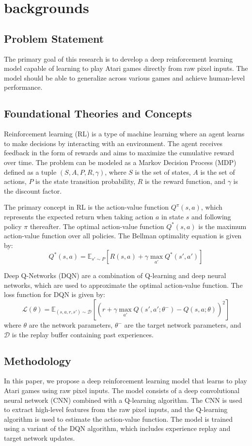 \section{backgrounds}

\subsection{Problem Statement}
The primary goal of this research is to develop a deep reinforcement learning model capable of learning to play Atari games directly from raw pixel inputs. The model should be able to generalize across various games and achieve human-level performance.

\subsection{Foundational Theories and Concepts}
Reinforcement learning (RL) is a type of machine learning where an agent learns to make decisions by interacting with an environment. The agent receives feedback in the form of rewards and aims to maximize the cumulative reward over time. The problem can be modeled as a Markov Decision Process (MDP) defined as a tuple $(S, A, P, R, \gamma)$, where $S$ is the set of states, $A$ is the set of actions, $P$ is the state transition probability, $R$ is the reward function, and $\gamma$ is the discount factor.

The primary concept in RL is the action-value function $Q^{\pi}(s, a)$, which represents the expected return when taking action $a$ in state $s$ and following policy $\pi$ thereafter. The optimal action-value function $Q^{*}(s, a)$ is the maximum action-value function over all policies. The Bellman optimality equation is given by:
\[Q^{*}(s, a) = \mathbb{E}_{s' \sim P}[R(s, a) + \gamma \max_{a'} Q^{*}(s', a')]\]

Deep Q-Networks (DQN) are a combination of Q-learning and deep neural networks, which are used to approximate the optimal action-value function. The loss function for DQN is given by:
\[\mathcal{L}(\theta) = \mathbb{E}_{(s, a, r, s') \sim \mathcal{D}}[(r + \gamma \max_{a'} Q(s', a'; \theta^{-}) - Q(s, a; \theta))^2]\]
where $\theta$ are the network parameters, $\theta^{-}$ are the target network parameters, and $\mathcal{D}$ is the replay buffer containing past experiences.

\subsection{Methodology}
In this paper, we propose a deep reinforcement learning model that learns to play Atari games using raw pixel inputs. The model consists of a deep convolutional neural network (CNN) combined with a Q-learning algorithm. The CNN is used to extract high-level features from the raw pixel inputs, and the Q-learning algorithm is used to estimate the action-value function. The model is trained using a variant of the DQN algorithm, which includes experience replay and target network updates.

